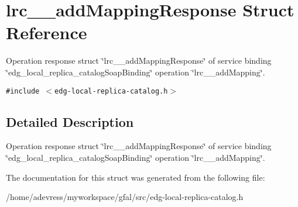 \section{lrc\_\-\_\-add\-Mapping\-Response Struct Reference}
\label{structlrc____addMappingResponse}
Operation response struct \char`\"{}lrc\_\-\_\-add\-Mapping\-Response\char`\"{} of service binding \char`\"{}edg\_\-local\_\-replica\_\-catalog\-Soap\-Binding\char`\"{} operation \char`\"{}lrc\_\-\_\-add\-Mapping\char`\"{}.  


{\tt \#include $<$edg-local-replica-catalog.h$>$}



\subsection{Detailed Description}
Operation response struct \char`\"{}lrc\_\-\_\-add\-Mapping\-Response\char`\"{} of service binding \char`\"{}edg\_\-local\_\-replica\_\-catalog\-Soap\-Binding\char`\"{} operation \char`\"{}lrc\_\-\_\-add\-Mapping\char`\"{}. 



The documentation for this struct was generated from the following file:\begin{CompactItemize}
\item 
/home/adevress/myworkspace/gfal/src/edg-local-replica-catalog.h\end{CompactItemize}
